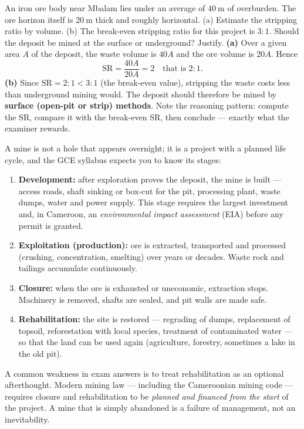 \documentclass[11pt]{article}
\newcounter{popsec}
\newcounter{popsub}
\newcommand{\courssub}[1]{%
  \stepcounter{popsub}%
  \par\vspace{9pt}\noindent{\popxbold\fontsize{11.5}{13}\selectfont\color{popink}{\color{poporange}\thepopsec.\thepopsub}\hspace{6pt}#1}\par\nopagebreak\vspace{4pt}
}
\begin{document}
\begin{exoresolu}
An iron ore body near Mbalam lies under an average of $40\ \mathrm{m}$ of overburden. The ore horizon itself is $20\ \mathrm{m}$ thick and roughly horizontal. (a) Estimate the stripping ratio by volume. (b) The break-even stripping ratio for this project is $3:1$. Should the deposit be mined at the surface or underground? Justify.
\tcblower
\textbf{(a)} Over a given area $A$ of the deposit, the waste volume is $40A$ and the ore volume is $20A$. Hence
\[ \mathrm{SR} = \frac{40A}{20A} = 2 \quad \text{that is } 2:1. \]
\textbf{(b)} Since $\mathrm{SR} = 2:1 < 3:1$ (the break-even value), stripping the waste costs less than underground mining would. The deposit should therefore be mined by \textbf{surface (open-pit or strip) methods}. Note the reasoning pattern: compute the SR, compare it with the break-even SR, then conclude --- exactly what the examiner rewards.
\end{exoresolu}

\courssub{The Life Cycle of a Mine}

A mine is not a hole that appears overnight; it is a project with a planned life cycle, and the GCE syllabus expects you to know its stages:

\begin{enumerate}
\item \textbf{Development:} after exploration proves the deposit, the mine is built --- access roads, shaft sinking or box-cut for the pit, processing plant, waste dumps, water and power supply. This stage requires the largest investment and, in Cameroon, an \emph{environmental impact assessment} (EIA) before any permit is granted.
\item \textbf{Exploitation (production):} ore is extracted, transported and processed (crushing, concentration, smelting) over years or decades. Waste rock and tailings accumulate continuously.
\item \textbf{Closure:} when the ore is exhausted or uneconomic, extraction stops. Machinery is removed, shafts are sealed, and pit walls are made safe.
\item \textbf{Rehabilitation:} the site is restored --- regrading of dumps, replacement of topsoil, reforestation with local species, treatment of contaminated water --- so that the land can be used again (agriculture, forestry, sometimes a lake in the old pit).
\end{enumerate}

\begin{attention}
A common weakness in exam answers is to treat rehabilitation as an optional afterthought. Modern mining law --- including the Cameroonian mining code --- requires closure and rehabilitation to be \emph{planned and financed from the start} of the project. A mine that is simply abandoned is a failure of management, not an inevitability.
\end{attention}
\end{document}
